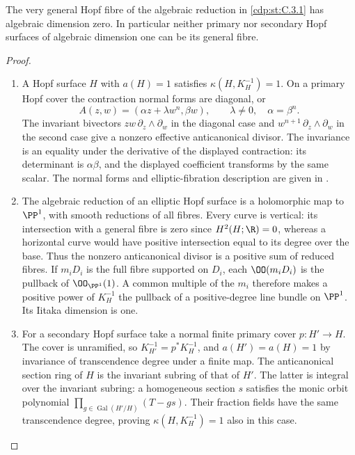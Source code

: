 \begin{proposition}\hypertarget{tag-01FE}{}\label{cdp:st:C.3.8}


The very general Hopf fibre of the algebraic reduction in \ref{cdp:st:C.3.1}
has algebraic dimension zero. In particular neither primary nor
secondary Hopf surfaces of algebraic dimension one can be its
general fibre.
\end{proposition}


\begin{proof}

\begin{enumerate}[label=\arabic*.,leftmargin=*]
\item A Hopf surface $H$ with $a(H)=1$ satisfies
$\kappa(H,K_H^{-1})=1$. On a primary Hopf cover the contraction
normal forms are diagonal, or
\[
A(z,w)=(\alpha z+\lambda w^n,\beta w),\qquad
\lambda\ne0,\quad \alpha=\beta^n.
\]
The invariant bivectors $zw\,\partial_z\wedge\partial_w$ in the
diagonal case and $w^{n+1}\,\partial_z\wedge\partial_w$ in the
second case give a nonzero effective anticanonical divisor.
The invariance is an equality under the derivative of the
displayed contraction: its determinant is $\alpha\beta$, and
the displayed coefficient transforms by the same scalar.
The normal forms and elliptic-fibration description are given in \cite[Proposition~3.1 and its proof, pp.~6--7]{SS2002}.

\item The algebraic reduction of an elliptic Hopf surface is a
holomorphic map to $\PP^1$, with smooth reductions of all fibres.
Every curve is vertical: its intersection with a general fibre
is zero since $H^2(H;\R)=0$, whereas a horizontal curve would
have positive intersection equal to its degree over the base.
Thus the nonzero anticanonical divisor is a positive sum of
reduced fibres. If $m_iD_i$ is the full fibre supported on
$D_i$, each $\OO(m_iD_i)$ is the pullback of $\OO_{\PP^1}(1)$.
A common multiple of the $m_i$ therefore makes a positive power
of $K_H^{-1}$ the pullback of a positive-degree line bundle on
$\PP^1$. Its Iitaka dimension is one.

\item For a secondary Hopf surface take a normal finite primary cover
$p:H'\to H$. The cover is unramified, so
$K_{H'}^{-1}=p^*K_H^{-1}$, and $a(H')=a(H)=1$ by invariance of
transcendence degree under a finite map. The anticanonical
section ring of $H$ is the invariant subring of that of $H'$.
The latter is integral over the invariant subring: a homogeneous
section $s$ satisfies the monic orbit polynomial
$\prod_{g\in\operatorname{Gal}(H'/H)}(T-gs)$. Their fraction
fields have the same transcendence degree, proving
$\kappa(H,K_H^{-1})=1$ also in this case.


\end{enumerate}
\end{proof}
